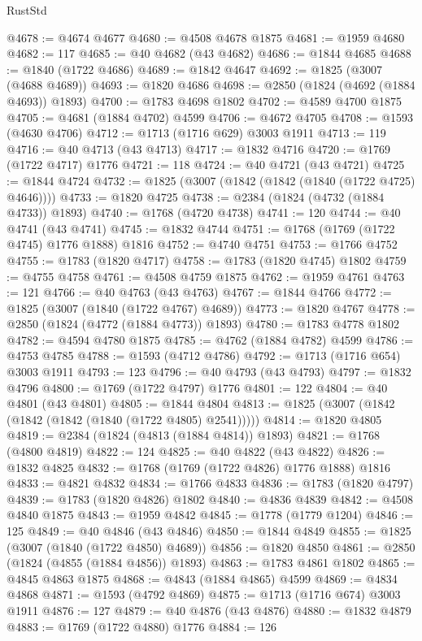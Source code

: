 \begin{lexlean}{RustStd}
\begin{coremodule}
{\begin{coremodule}
{{{{{{{{{{{{{{{{{{{{{{{{{{{{{{{{{{{{{{{{{{{{{{{@4678 := @4674 @4677
@4680 := @4508 @4678 @1875
@4681 := @1959 @4680
@4682 := 117
@4685 := @40 @4682 (@43 @4682)
@4686 := @1844 @4685
@4688 := @1840 (@1722 @4686)
@4689 := @1842 @4647
@4692 := @1825 (@3007 (@4688 @4689))
@4693 := @1820 @4686
@4698 := @2850 (@1824 (@4692 (@1884 @4693)) @1893)
@4700 := @1783 @4698 @1802
@4702 := @4589 @4700 @1875
@4705 := @4681 (@1884 @4702) @4599
@4706 := @4672 @4705
@4708 := @1593 (@4630 @4706)
@4712 := @1713 (@1716 @629) @3003 @1911
@4713 := 119
@4716 := @40 @4713 (@43 @4713)
@4717 := @1832 @4716
@4720 := @1769 (@1722 @4717) @1776
@4721 := 118
@4724 := @40 @4721 (@43 @4721)
@4725 := @1844 @4724
@4732 := @1825 (@3007 (@1842 (@1842 (@1840 (@1722 @4725) @4646))))
@4733 := @1820 @4725
@4738 := @2384 (@1824 (@4732 (@1884 @4733)) @1893)
@4740 := @1768 (@4720 @4738)
@4741 := 120
@4744 := @40 @4741 (@43 @4741)
@4745 := @1832 @4744
@4751 := @1768 (@1769 (@1722 @4745) @1776 @1888) @1816
@4752 := @4740 @4751
@4753 := @1766 @4752
@4755 := @1783 (@1820 @4717)
@4758 := @1783 (@1820 @4745) @1802
@4759 := @4755 @4758
@4761 := @4508 @4759 @1875
@4762 := @1959 @4761
@4763 := 121
@4766 := @40 @4763 (@43 @4763)
@4767 := @1844 @4766
@4772 := @1825 (@3007 (@1840 (@1722 @4767) @4689))
@4773 := @1820 @4767
@4778 := @2850 (@1824 (@4772 (@1884 @4773)) @1893)
@4780 := @1783 @4778 @1802
@4782 := @4594 @4780 @1875
@4785 := @4762 (@1884 @4782) @4599
@4786 := @4753 @4785
@4788 := @1593 (@4712 @4786)
@4792 := @1713 (@1716 @654) @3003 @1911
@4793 := 123
@4796 := @40 @4793 (@43 @4793)
@4797 := @1832 @4796
@4800 := @1769 (@1722 @4797) @1776
@4801 := 122
@4804 := @40 @4801 (@43 @4801)
@4805 := @1844 @4804
@4813 := @1825 (@3007 (@1842 (@1842 (@1842 (@1840 (@1722 @4805) @2541)))))
@4814 := @1820 @4805
@4819 := @2384 (@1824 (@4813 (@1884 @4814)) @1893)
@4821 := @1768 (@4800 @4819)
@4822 := 124
@4825 := @40 @4822 (@43 @4822)
@4826 := @1832 @4825
@4832 := @1768 (@1769 (@1722 @4826) @1776 @1888) @1816
@4833 := @4821 @4832
@4834 := @1766 @4833
@4836 := @1783 (@1820 @4797)
@4839 := @1783 (@1820 @4826) @1802
@4840 := @4836 @4839
@4842 := @4508 @4840 @1875
@4843 := @1959 @4842
@4845 := @1778 (@1779 @1204)
@4846 := 125
@4849 := @40 @4846 (@43 @4846)
@4850 := @1844 @4849
@4855 := @1825 (@3007 (@1840 (@1722 @4850) @4689))
@4856 := @1820 @4850
@4861 := @2850 (@1824 (@4855 (@1884 @4856)) @1893)
@4863 := @1783 @4861 @1802
@4865 := @4845 @4863 @1875
@4868 := @4843 (@1884 @4865) @4599
@4869 := @4834 @4868
@4871 := @1593 (@4792 @4869)
@4875 := @1713 (@1716 @674) @3003 @1911
@4876 := 127
@4879 := @40 @4876 (@43 @4876)
@4880 := @1832 @4879
@4883 := @1769 (@1722 @4880) @1776
@4884 := 126
}}}}}}}}}}}}}}}}}}}}}}}}}}}}}}}}}}}}}}}}}}}}}}}
\end{coremodule}}
\end{coremodule}
\end{lexlean}
